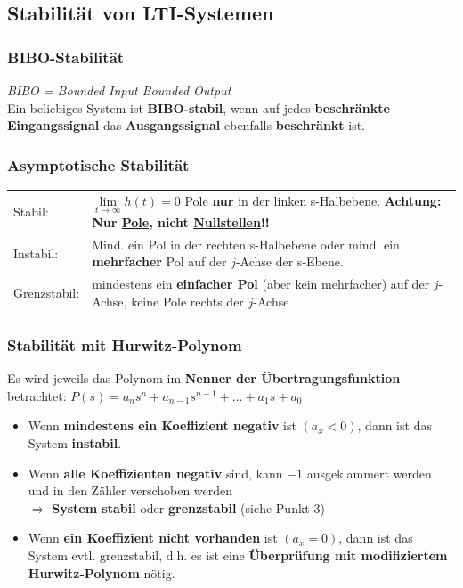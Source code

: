 		
	\newpage
	\subsection{Stabilität von LTI-Systemen}
		\renewcommand{\arraystretchOriginal}{1}
		\subsubsection{BIBO-Stabilität }
		
		\textit{BIBO = Bounded Input Bounded Output}\\
		Ein beliebiges System ist \textbf{BIBO-stabil}, wenn auf jedes \textbf{beschränkte Eingangssignal}
		das \textbf{Ausgangssignal} ebenfalls \textbf{beschränkt} ist.
	
	
		\subsubsection{Asymptotische Stabilität }
		
			\begin{tabular}{ll}
				Stabil: 
			& 	$\lim\limits_{t\rightarrow\infty} h(t) = 0$ \qquad Pole \textbf{nur} in der linken s-Halbebene.
				\textbf{Achtung: Nur \underline{Pole}, nicht \underline{Nullstellen}!!}
			\\
				Instabil: 
			& 	Mind. ein Pol in der rechten s-Halbebene oder mind. ein \textbf{mehrfacher} Pol auf der $j$-Achse der s-Ebene.
			\\
				Grenzstabil:
			& 	mindestens ein \textbf{einfacher Pol} (aber kein mehrfacher) auf der $j$-Achse, keine Pole rechts der $j$-Achse
			\end{tabular}
		
		
		\subsubsection{Stabilität mit Hurwitz-Polynom }
		
			Es wird jeweils das Polynom im \textbf{Nenner der Übertragungsfunktion} betrachtet:
			$P(s) = a_n s^n + a_{n-1} s^{n-1} +\ldots +a_1s + a_0$
			
			\begin{itemize}
				\item Wenn \textbf{mindestens ein Koeffizient negativ} ist $(a_x < 0)$, dann ist das System \textbf{instabil}.
			  	\item Wenn \textbf{alle Koeffizienten negativ} sind, kann $-1$ ausgeklammert werden und in den Zähler verschoben werden\\
			  			$\Rightarrow$ \textbf{System stabil} oder \textbf{grenzstabil} (siehe Punkt 3)
			  	\item Wenn \textbf{ein Koeffizient nicht vorhanden} ist $(a_x = 0)$, dann ist das System evtl. grenzstabil, 
			  			d.h. es ist eine \textbf{Überprüfung mit modifiziertem Hurwitz-Polynom} nötig.
			\end{itemize}
			
